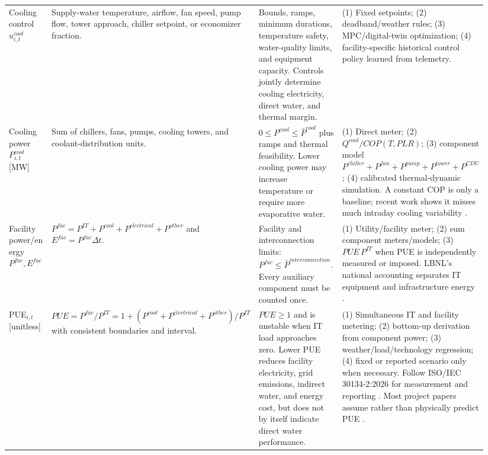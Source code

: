 \documentclass[10pt]{article}
\begin{document}
\begin{landscape}
\begin{longtable}{@{}P{0.12\linewidth}P{0.27\linewidth}P{0.25\linewidth}P{0.30\linewidth}@{}}
Cooling control $u^{cool}_{i,t}$ & Supply-water temperature, airflow, fan speed, pump flow, tower approach, chiller setpoint, or economizer fraction. & Bounds, ramps, minimum durations, temperature safety, water-quality limits, and equipment capacity. Controls jointly determine cooling electricity, direct water, and thermal margin. & (1) Fixed setpoints; (2) deadband/weather rules; (3) MPC/digital-twin optimization; (4) facility-specific historical control policy learned from telemetry. \\

Cooling power $P^{cool}_{i,t}$ [MW] & Sum of chillers, fans, pumps, cooling towers, and coolant-distribution units. & $0\le P^{cool}\le\bar P^{cool}$ plus ramps and thermal feasibility. Lower cooling power may increase temperature or require more evaporative water. & (1) Direct meter; (2) $Q^{cool}/COP(T,PLR)$; (3) component model $P^{chiller}+P^{fan}+P^{pump}+P^{tower}+P^{CDU}$; (4) calibrated thermal-dynamic simulation. A constant COP is only a baseline; recent work shows it misses much intraday cooling variability \cite{ngwerume2026thermal}. \\

Facility power/energy $P^{fac},E^{fac}$ & $P^{fac}=P^{IT}+P^{cool}+P^{electrical}+P^{other}$ and $E^{fac}=P^{fac}\Delta t$. & Facility and interconnection limits: $P^{fac}\le\bar P^{interconnection}$. Every auxiliary component must be counted once. & (1) Utility/facility meter; (2) sum component meters/models; (3) $PUE\,P^{IT}$ when PUE is independently measured or imposed. LBNL's national accounting separates IT equipment and infrastructure energy \cite{shehabi2024report}. \\

PUE$_{i,t}$ [unitless] & $PUE=P^{fac}/P^{IT}=1+(P^{cool}+P^{electrical}+P^{other})/P^{IT}$ with consistent boundaries and interval. & $PUE\ge1$ and is unstable when IT load approaches zero. Lower PUE reduces facility electricity, grid emissions, indirect water, and energy cost, but does not by itself indicate direct water performance. & (1) Simultaneous IT and facility metering; (2) bottom-up derivation from component power; (3) weather/load/technology regression; (4) fixed or reported scenario only when necessary. Follow ISO/IEC 30134-2:2026 for measurement and reporting \cite{isoPUE}. Most project papers assume rather than physically predict PUE \cite{islam2018wace,li2024equitable,hall2024probabilistic,chen2026pscc}. \\


\end{longtable}
\end{landscape}
\end{document}
